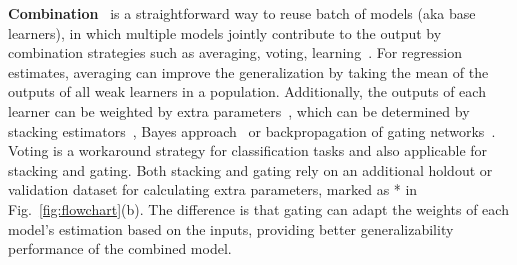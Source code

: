 \textbf{Combination}~\cite{zhou2012ensemble} is a straightforward way to reuse batch of models (aka base learners), in which multiple models jointly contribute to the output by combination strategies such as averaging, voting, learning~\cite{jacobs1991adaptive, wolpert1992stacked}.
For regression estimates, averaging can improve the generalization by taking the mean of the outputs of all weak learners in a population. Additionally, the outputs of each learner can be weighted by extra parameters~\cite{perrone1995networks}, which can be determined by stacking estimators~\cite{wolpert1992stacked}, Bayes approach~\cite{clarke2003comparing} or backpropagation of gating networks~\cite{jacobs1991adaptive}. 
Voting is a workaround strategy for classification tasks and also applicable for stacking and gating.
Both stacking and gating rely on an additional holdout or validation dataset for calculating extra parameters, marked as * in Fig.~\ref{fig:flowchart}(b). 
The difference is that gating can adapt the weights of each model's estimation based on the inputs, providing better generalizability performance of the combined model.

